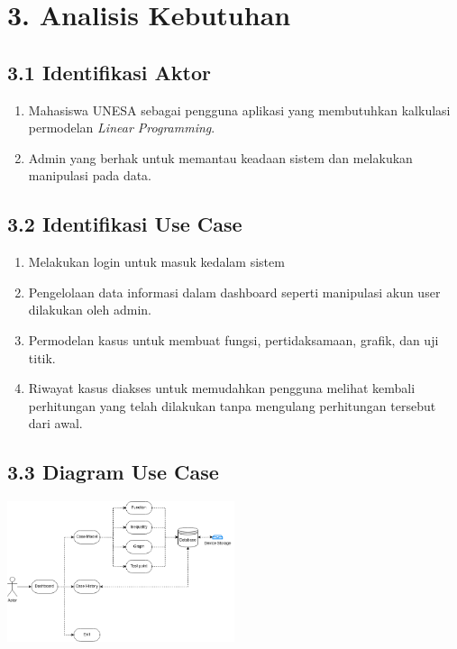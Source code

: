 \documentclass[a4paper]{article}
\begin{document}
\section*{3. Analisis Kebutuhan}
    \subsection*{3.1 Identifikasi Aktor}
    \begin{enumerate}
        \item Mahasiswa UNESA sebagai pengguna aplikasi yang
        membutuhkan kalkulasi permodelan \textit{Linear Programming}.
        \item Admin yang berhak untuk memantau keadaan sistem 
        dan melakukan manipulasi pada data.
    \end{enumerate}
    \subsection*{3.2 Identifikasi Use Case}
    \begin{enumerate}
        \item Melakukan login untuk masuk kedalam sistem
        \item Pengelolaan data informasi dalam dashboard
        seperti manipulasi akun user dilakukan oleh admin.
        \item Permodelan kasus untuk membuat fungsi, pertidaksamaan,
        grafik, dan uji titik.
        \item Riwayat kasus diakses untuk memudahkan pengguna melihat
        kembali perhitungan yang telah dilakukan tanpa mengulang
        perhitungan tersebut dari awal.
    \end{enumerate}
    \subsection*{3.3 Diagram Use Case}
    \begin{center}
    \includegraphics[width=0.5\textwidth]{Scheme.png}
    \end{center}
\end{document}
